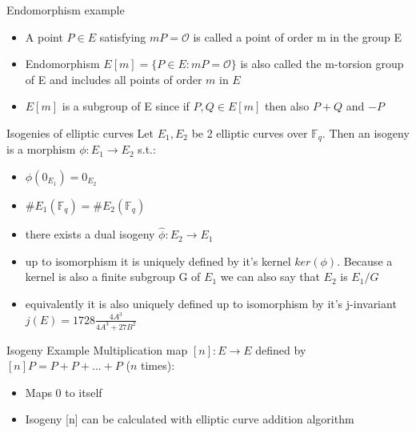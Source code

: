 \documentclass{beamer}
\begin{document}
\begin{frame}{Endomorphism example}
\begin{itemize}[\textbullet]
	\item A point $P\in E$ satisfying $mP=\mathcal{O}$ is called a point of order m in the group E\pause
	\item Endomorphism $E[m] = \{P\in E: mP = \mathcal{O}\}$ is also called the m-torsion group of E and includes all points of order $m$ in $E$\pause
	\item $E[m] $ is a subgroup of E since if $P,Q\in E[m]$ then also $P+Q$ and $-P$
\end{itemize}	

\end{frame}


\begin{frame}{Isogenies of elliptic curves}  %
Let $E_1,E_2$ be 2 elliptic curves over $\mathbb{F}_q$. Then an isogeny is a morphism $\phi: E_1 \to E_2$ s.t.:
\begin{itemize}[\textbullet]
	\item $\phi(0_{E_1})= 0_{E_2}$\pause
	\item $\#E_1(\mathbb{F}_q) = \#E_2(\mathbb{F}_q)$\pause
	\item there exists a dual isogeny $\hat{\phi}: E_2 \to E_1$\pause
	\item up to isomorphism it is uniquely defined by it's kernel $ker(\phi)$. Because a kernel is also a finite subgroup G of $E_1$ we can also say that $E_2$ is $E_1/G$\pause
	\item equivalently it is also uniquely defined up to isomorphism by it's j-invariant $j(E)=1728\frac{4A^3}{4A^3+27B^2}$
\end{itemize}
\end{frame}

\begin{frame}{Isogeny Example}
	Multiplication map $[n]: E \to E$ defined by $[n]P = P + P + ...+ P$ ($n$ times):
	\begin{itemize}[\textbullet]
		\item Maps 0 to itself

		\item Isogeny [n] can be calculated with elliptic curve addition algorithm %
		
	\end{itemize}

\end{frame}
\end{document}
